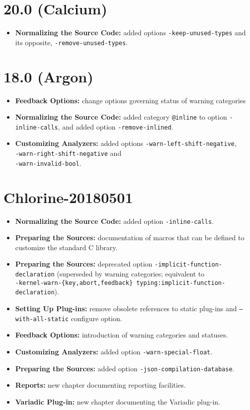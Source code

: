 \section*{20.0 (Calcium)}

\begin{itemize}
\item \textbf{Normalizing the Source Code:} added options
  \texttt{-keep-unused-types} and its opposite,
  \texttt{-remove-unused-types}.
\end{itemize}

\section*{18.0 (Argon)}

\begin{itemize}
\item \textbf{Feedback Options:} change options governing status of warning categories
\item \textbf{Normalizing the Source Code:} added category \texttt{@inline} to
option \texttt{-inline-calls}, and added option \texttt{-remove-inlined}.
\item \textbf{Customizing Analyzers:} added options
  \texttt{-warn-left-shift-negative}, \\
  \texttt{-warn-right-shift-negative} and \\
  \texttt{-warn-invalid-bool}.
\end{itemize}

\section*{Chlorine-20180501}

\begin{itemize}
\item \textbf{Normalizing the Source Code:} added option \texttt{-inline-calls}.
\item \textbf{Preparing the Sources:} documentation of macros that can be
  defined to customize the standard C library.
\item \textbf{Preparing the Sources:} deprecated option
  \texttt{-implicit-function-declaration} (superseded by
  warning categories; equivalent to\\
  \texttt{-kernel-warn-\{key,abort,feedback\} typing:implicit-function-declaration}).
\item \textbf{Setting Up Plug-ins:} remove obsolete references
 to static plug-ins and \texttt{--with-all-static} configure option.
\item \textbf{Feedback Options:} introduction of warning categories and statuses.
\item \textbf{Customizing Analyzers:} added option \texttt{-warn-special-float}.
\item \textbf{Preparing the Sources:} added option
  \texttt{-json-compilation-database}.
\item \textbf{Reports:} new chapter documenting reporting facilities.
\item \textbf{Variadic Plug-in:} new chapter documenting the Variadic plug-in.
\end{itemize}

